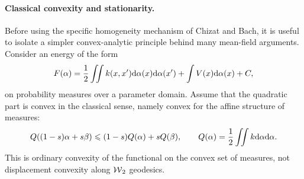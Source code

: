 \paragraph{Classical convexity and stationarity.}
Before using the specific homogeneity mechanism of Chizat and Bach, it is useful to isolate a simpler convex-analytic principle behind many mean-field arguments. Consider an energy of the form
\[
	F(\alpha)
	=
	\frac12\iint k(x,x')\mathrm{d}\alpha(x)\mathrm{d}\alpha(x')
	+
	\int V(x)\mathrm{d}\alpha(x)
	+C,
\]
on probability measures over a parameter domain. Assume that the quadratic part is convex in the classical sense, namely convex for the affine structure of measures:
\[
	Q((1-s)\alpha+s\beta)\leqslant (1-s)Q(\alpha)+sQ(\beta),
	\qquad
	Q(\alpha)=\frac12\iint k\mathrm{d}\alpha\mathrm{d}\alpha.
\]
This is ordinary convexity of the functional on the convex set of measures, not displacement convexity along $\operatorname{\mathcal{W}}_2$ geodesics.

